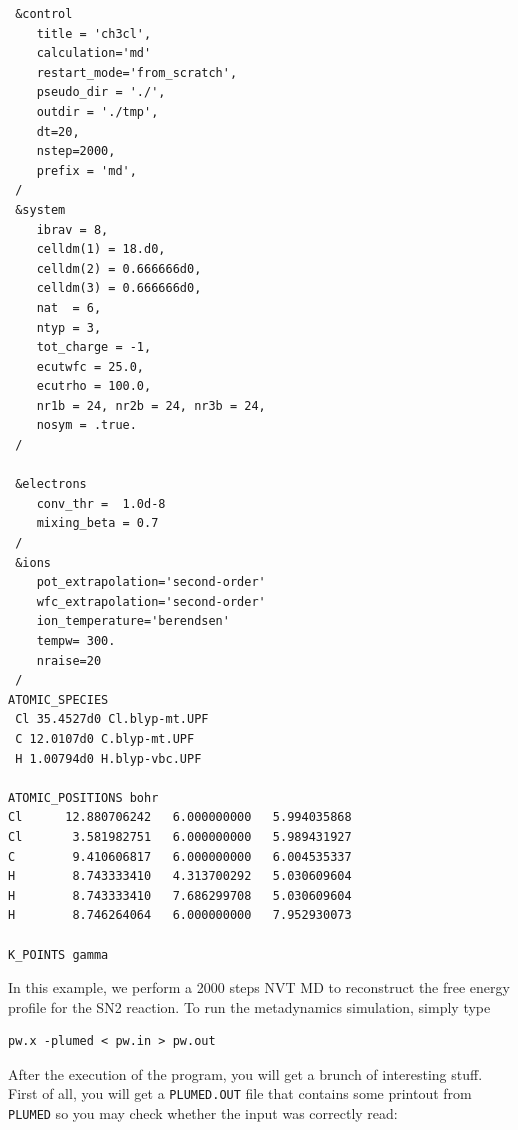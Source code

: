 \documentclass[12pt,a4paper]{article}
\begin{document}
\begin{verbatim}
 &control
    title = 'ch3cl',
    calculation='md'
    restart_mode='from_scratch',
    pseudo_dir = './',
    outdir = './tmp',
    dt=20,
    nstep=2000,
    prefix = 'md',
 /
 &system
    ibrav = 8,
    celldm(1) = 18.d0,
    celldm(2) = 0.666666d0,
    celldm(3) = 0.666666d0,
    nat  = 6,
    ntyp = 3,
    tot_charge = -1,
    ecutwfc = 25.0,
    ecutrho = 100.0,
    nr1b = 24, nr2b = 24, nr3b = 24,
    nosym = .true.
 /

 &electrons
    conv_thr =  1.0d-8
    mixing_beta = 0.7
 /
 &ions
    pot_extrapolation='second-order'
    wfc_extrapolation='second-order'
    ion_temperature='berendsen'
    tempw= 300.
    nraise=20
 /
ATOMIC_SPECIES
 Cl 35.4527d0 Cl.blyp-mt.UPF
 C 12.0107d0 C.blyp-mt.UPF
 H 1.00794d0 H.blyp-vbc.UPF

ATOMIC_POSITIONS bohr
Cl      12.880706242   6.000000000   5.994035868
Cl       3.581982751   6.000000000   5.989431927
C        9.410606817   6.000000000   6.004535337
H        8.743333410   4.313700292   5.030609604
H        8.743333410   7.686299708   5.030609604
H        8.746264064   6.000000000   7.952930073

K_POINTS gamma
\end{verbatim}

In this example, we perform a 2000 steps NVT MD to reconstruct the free energy profile for the SN2 reaction. To run the metadynamics simulation, simply type

\begin{verbatim}
pw.x -plumed < pw.in > pw.out
\end{verbatim}

After the execution of the program, you will get a brunch of interesting stuff. First of all, you will get a \texttt{PLUMED.OUT} file that contains some printout from \texttt{PLUMED} so you may check whether the input was correctly read:
\end{document}
